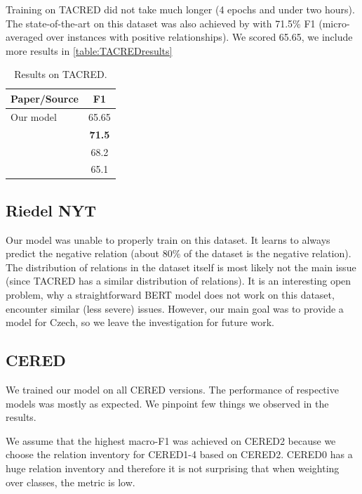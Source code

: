 Training on TACRED did not take much longer (4 epochs and under two hours). The state-of-the-art on this dataset was also achieved by \cite{baldini-soares-etal-2019-matching} with 71.5\% F1 (micro-averaged over instances with positive relationships). We scored 65.65, we include more results in \autoref{table:TACREDresults}


\begin{table}[h]
\centering
\caption{Results on TACRED.}
\label{table:TACREDresults}
\begin{tabular}{l c }
\hline
Paper/Source & F1 \\
\hline
\hline
Our model & 65.65 \\
\textbf{\cite{baldini-soares-etal-2019-matching}} & \textbf{71.5} \\
\textit{\cite{zhang-etal-2018-graph-TACRED}} & 68.2 \\
\textit{\cite{zhang-etal-2017-position_TACRED}} & 65.1 \\
\hline

\end{tabular}
\end{table}

\subsection{Riedel NYT}

Our model was unable to properly train on this dataset. It learns to always predict the negative relation (about 80\% of the dataset is the negative relation). The distribution of relations in the dataset itself is most likely not the main issue (since TACRED has a similar distribution of relations). It is an interesting open problem, why a straightforward BERT model does not work on this dataset, \cite{nyt-nefunguje} encounter similar (less severe) issues. However, our main goal was to provide a model for Czech, so we leave the investigation for future work.




\subsection{CERED}
We trained our model on all CERED versions. The performance of respective models was mostly as expected.  We pinpoint few things we observed in the results. 

We assume that the highest macro-F1 was achieved on CERED2 because we choose the relation inventory for CERED1-4 based on CERED2. CERED0 has a huge relation inventory and therefore it is not surprising that when weighting over classes, the metric is low.

